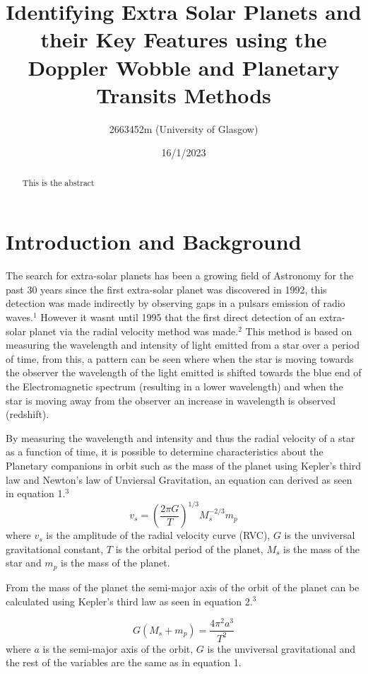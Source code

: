 \documentclass[]{article}
\title{\textbf{Identifying Extra Solar Planets and their Key Features using 
the Doppler Wobble and Planetary Transits Methods}}
\author{2663452m (University of Glasgow)}
\date{16/1/2023}
\begin{document}
\maketitle

\begin{abstract}
This is the abstract

\end{abstract}
\newpage



\twocolumn
\section*{Introduction and Background}
The search for extra-solar planets has been a growing field of Astronomy for the 
past 30 years since the first extra-solar planet was discovered in 1992, this 
detection was made indirectly by observing gaps in a pulsars emission of radio waves.$^1 $
However it wasnt until 1995 that the first direct detection of an extra-solar planet 
via the radial velocity method was made.$^2$ This method is based on measuring the 
wavelength and intensity of light emitted from a star over a period of time, 
from this, a pattern can be seen where when the star is moving towards the observer
the wavelength of the light emitted is shifted towards the blue end of the 
Electromagnetic spectrum 
(resulting in a lower wavelength) and when the star is moving away from the observer
an increase in wavelength is observed (redshift). 
\par
By measuring the wavelength and intensity and thus the radial velocity of a star as 
a function of time, it is possible to determine characteristics about the Planetary
companions in orbit such as the mass of the planet using Kepler's third law and Newton's
law of Unviersal Gravitation, an equation can derived as seen in equation 1.$^3$
\begin{equation}\label{eq:mass of planet eq}
  v_s = \left(\frac{2\pi G}{T}\right)^{1/3}M_s^{-2/3}m_p
\end{equation}
where $v_s$ is the amplitude of the radial velocity curve (RVC), $G$ is the unviversal
gravitational constant, $T$ is the orbital period of the planet, $M_s$ is the mass of
the star and $m_p$ is the mass of the planet.
\par
From the mass of the planet the semi-major axis of the orbit of the planet can be 
calculated using Kepler's third law as seen in equation 2.$^3$

\begin{equation}\label{eq:semi-major axis eq}
  G(M_s+m_p) = \frac{4\pi^2a^3}{T^2}
\end{equation}
where $a$ is the semi-major axis of the orbit, $G$ is the unviversal gravitational
and the rest of the variables are the same as in equation 1.
\par
\end{document}
